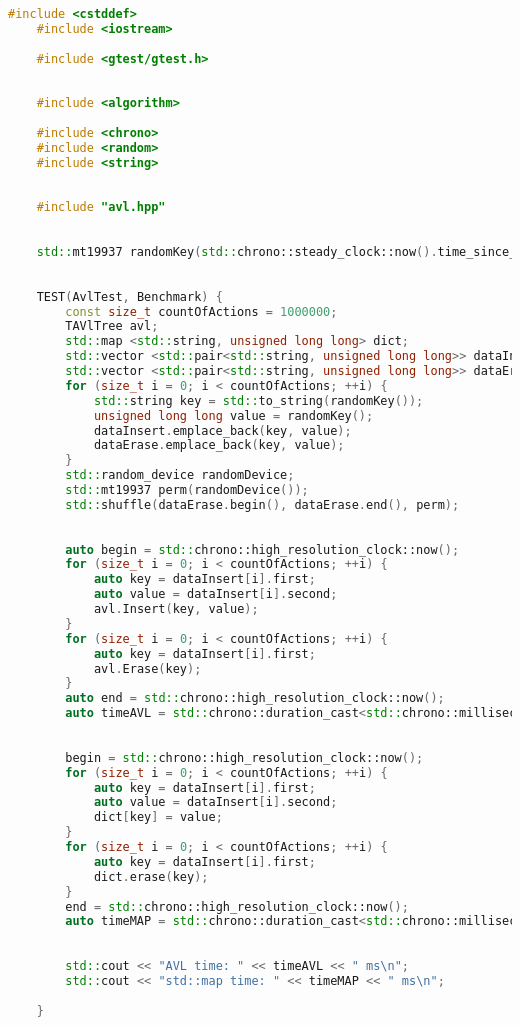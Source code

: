 \begin{lstlisting}[language=C++]
    #include <cstddef>
    #include <iostream>
    
    #include <gtest/gtest.h>
    
    
    #include <algorithm>
    
    #include <chrono>
    #include <random>
    #include <string>
    
    
    #include "avl.hpp"
    
    
    std::mt19937 randomKey(std::chrono::steady_clock::now().time_since_epoch().count());
    
    
    TEST(AvlTest, Benchmark) {
        const size_t countOfActions = 1000000;
        TAVlTree avl;
        std::map <std::string, unsigned long long> dict;
        std::vector <std::pair<std::string, unsigned long long>> dataInsert;
        std::vector <std::pair<std::string, unsigned long long>> dataErase;
        for (size_t i = 0; i < countOfActions; ++i) {
            std::string key = std::to_string(randomKey());
            unsigned long long value = randomKey();
            dataInsert.emplace_back(key, value);
            dataErase.emplace_back(key, value);
        }
        std::random_device randomDevice;
        std::mt19937 perm(randomDevice());
        std::shuffle(dataErase.begin(), dataErase.end(), perm);
    
    
        auto begin = std::chrono::high_resolution_clock::now();
        for (size_t i = 0; i < countOfActions; ++i) {
            auto key = dataInsert[i].first;
            auto value = dataInsert[i].second;
            avl.Insert(key, value);
        }
        for (size_t i = 0; i < countOfActions; ++i) {
            auto key = dataInsert[i].first;
            avl.Erase(key);
        }
        auto end = std::chrono::high_resolution_clock::now();
        auto timeAVL = std::chrono::duration_cast<std::chrono::milliseconds>(end - begin).count();
    
    
        begin = std::chrono::high_resolution_clock::now();
        for (size_t i = 0; i < countOfActions; ++i) {
            auto key = dataInsert[i].first;
            auto value = dataInsert[i].second;
            dict[key] = value;
        }
        for (size_t i = 0; i < countOfActions; ++i) {
            auto key = dataInsert[i].first;
            dict.erase(key);
        }
        end = std::chrono::high_resolution_clock::now();
        auto timeMAP = std::chrono::duration_cast<std::chrono::milliseconds>(end - begin).count();
    
    
        std::cout << "AVL time: " << timeAVL << " ms\n";
        std::cout << "std::map time: " << timeMAP << " ms\n";
    
    }
    
    

\end{lstlisting}


